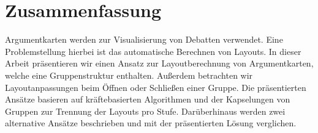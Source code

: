 \chapter*{Zusammenfassung}

Argumentkarten werden zur Visualisierung von Debatten verwendet. Eine Problemstellung hierbei ist das automatische Berechnen von Layouts.
In dieser Arbeit präsentieren wir einen Ansatz zur Layoutberechnung von Argumentkarten, welche eine Gruppenstruktur enthalten.
Außerdem betrachten wir Layoutanpassungen beim Öffnen oder Schließen einer Gruppe.
Die präsentierten Ansätze basieren auf kräftebasierten Algorithmen und der Kapselungen von Gruppen zur Trennung der Layouts pro Stufe. 
Darüberhinaus werden zwei alternative Ansätze beschrieben und mit der präsentierten Lösung verglichen.